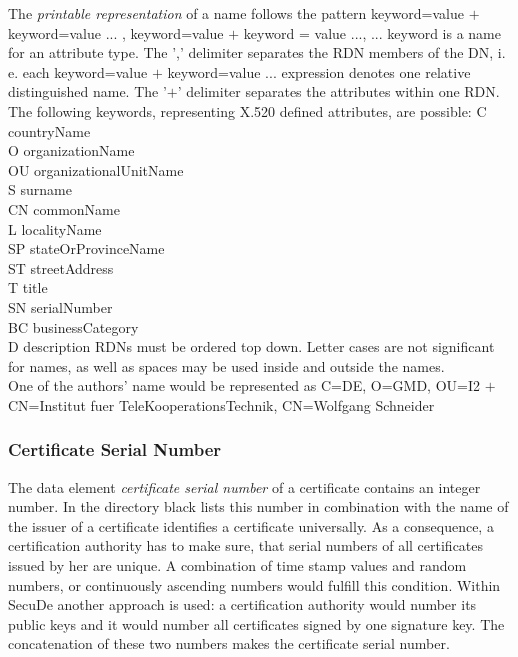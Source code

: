 The {\em printable representation} of a name follows the pattern
\bc
{\small keyword=value $+$ keyword=value ... , keyword=value $+$ keyword = value ..., ...}
\ec
keyword is a name for an attribute type. 
The ',' delimiter separates the RDN members of the DN, i. e. each 
keyword=value $+$ keyword=value ... expression denotes one relative distinguished name.
The '$+$' delimiter separates the attributes within one RDN.
The following keywords, representing X.520 defined attributes,  are possible:
{\small
\bvtab
C   \2 countryName \\
O   \2 organizationName  \\
OU  \2 organizationalUnitName \\
S   \2 surname \\
CN  \2 commonName \\
L   \2 localityName \\
SP  \2 stateOrProvinceName \\
ST  \2 streetAddress \\
T   \2 title \\
SN  \2 serialNumber \\
BC  \2 businessCategory \\
D   \2 description
\evtab
}
RDNs must be ordered top down. Letter cases are not significant for names, 
as well as spaces may be used inside and outside the names.
\\ [1ex]
One of the authors' name would be represented as
{\small
C=DE, O=GMD, OU=I2 $+$ CN=Institut fuer TeleKooperationsTechnik, CN=Wolfgang Schneider} 

\subsubsection{Certificate Serial Number}
\label{sc-csn}
 
The data element {\em certificate serial number} of a certificate
contains an integer number. In the directory black lists
this number in combination with the name of the issuer of a certificate
identifies a certificate universally.
As a consequence, a certification authority has to make sure,
that serial numbers of all certificates issued by her are unique.
A combination of time stamp values and random numbers,
or continuously ascending numbers would fulfill this condition.
Within SecuDe
another approach is used:
a certification authority would number its public keys
and it would number all certificates signed by one signature key.
The concatenation of these two numbers makes the certificate serial number.

